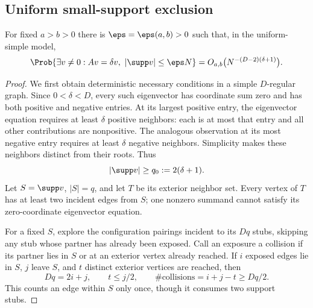 \subsection{Uniform small-support exclusion}
\begin{lemma}\label{lem:small-support}
For fixed $a>b>0$ there is $\eps=\eps(a,b)>0$ such that, in the
uniform-simple model,
\begin{equation}\label{eq:small-support}
 \Prob\{\exists v\ne0:Av=\delta v,\ |\supp v|\le\eps N\}
 =O_{a,b}\bigl(N^{-(D-2)(\delta+1)}\bigr).
\end{equation}
\end{lemma}
\begin{proof}
We first obtain deterministic necessary conditions in a simple
$D$-regular graph. Since $0<\delta<D$, every such eigenvector has
coordinate sum zero and has both positive and negative entries.
At its largest positive entry, the eigenvector equation requires at
least $\delta$ positive neighbors: each is at most that entry and all
other contributions are nonpositive. The analogous observation at its
most negative entry requires at least $\delta$ negative neighbors.
Simplicity makes these neighbors distinct from their roots. Thus
\begin{equation}\label{eq:min-support}
 |\supp v|\ge q_0:=2(\delta+1).
\end{equation}
Let $S=\supp v$, $|S|=q$, and let $T$ be its exterior neighbor set.
Every vertex of $T$ has at least two incident edges from $S$; one
nonzero summand cannot satisfy its zero-coordinate eigenvector equation.

For a fixed $S$, explore the configuration pairings incident to its
$Dq$ stubs, skipping any stub whose partner has already been exposed.
Call an exposure a collision if its partner lies in $S$ or at an
exterior vertex already reached. If $i$ exposed edges lie in $S$,
$j$ leave $S$, and $t$ distinct exterior vertices are reached, then
\[
 Dq=2i+j,\qquad t\le j/2,\qquad
 \#\text{collisions}=i+j-t\ge Dq/2.
\]
This counts an edge within $S$ only once, though it consumes two
support stubs.


\end{proof}
